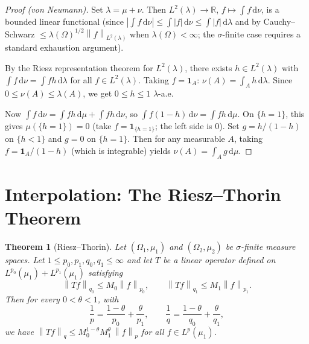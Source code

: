 \documentclass[a4paper,12pt]{book}
\newcommand{\R}{\mathbb{R}}
\newcommand{\dd}{\mathrm{d}}
\newcommand{\norm}[1]{\left\| #1 \right\|}
\newcommand{\abs}[1]{\left| #1 \right|}
\theoremstyle{definition}
\theoremstyle{plain}
\newtheorem{theorem}[definition]{Theorem}
\theoremstyle{remark}
\begin{document}
\begin{proof}[Proof (von Neumann)]
Set $\lambda = \mu + \nu$. Then $L^2(\lambda) \to \R$,
$f \mapsto \int f\, \dd\nu$, is a bounded linear functional (since
$\abs{\int f\, \dd\nu} \le \int \abs{f}\, \dd\nu \le \int \abs{f}\, \dd\lambda$
and by Cauchy--Schwarz $\le \lambda(\Omega)^{1/2}\norm{f}_{L^2(\lambda)}$ when
$\lambda(\Omega) < \infty$; the $\sigma$-finite case requires a standard exhaustion
argument).

By the Riesz representation theorem for $L^2(\lambda)$, there exists
$h \in L^2(\lambda)$ with $\int f\, \dd\nu = \int fh\, \dd\lambda$ for all
$f \in L^2(\lambda)$. Taking $f = \mathbf{1}_A$:
$\nu(A) = \int_A h\, \dd\lambda$. Since $0 \le \nu(A) \le \lambda(A)$, we
get $0 \le h \le 1$ $\lambda$-a.e.

Now $\int f\, \dd\nu = \int fh\, \dd\mu + \int fh\, \dd\nu$, so
$\int f(1 - h)\, \dd\nu = \int fh\, \dd\mu$. On $\{h = 1\}$, this gives
$\mu(\{h = 1\}) = 0$ (take $f = \mathbf{1}_{\{h=1\}}$; the left side is $0$). Set
$g = h/(1-h)$ on $\{h < 1\}$ and $g = 0$ on $\{h = 1\}$. Then for any measurable
$A$, taking $f = \mathbf{1}_A/(1-h)$ (which is integrable) yields
$\nu(A) = \int_A g\, \dd\mu$.
\end{proof}


\section{Interpolation: The Riesz--Thorin Theorem}\label{sec:riesz-thorin}


\begin{theorem}[Riesz--Thorin]\label{thm:riesz-thorin}
Let $(\Omega_1, \mu_1)$ and $(\Omega_2, \mu_2)$ be $\sigma$-finite measure spaces.
Let $1 \le p_0, p_1, q_0, q_1 \le \infty$ and let $T$ be a linear operator
defined on $L^{p_0}(\mu_1) + L^{p_1}(\mu_1)$ satisfying
\[
  \norm{Tf}_{q_0} \le M_0\norm{f}_{p_0}, \qquad
  \norm{Tf}_{q_1} \le M_1\norm{f}_{p_1}.
\]
Then for every $0 < \theta < 1$, with
\[
  \frac{1}{p} = \frac{1-\theta}{p_0} + \frac{\theta}{p_1}, \qquad
  \frac{1}{q} = \frac{1-\theta}{q_0} + \frac{\theta}{q_1},
\]
we have $\norm{Tf}_q \le M_0^{1-\theta} M_1^\theta\, \norm{f}_p$ for all
$f \in L^p(\mu_1)$.
\end{theorem}
\end{document}
